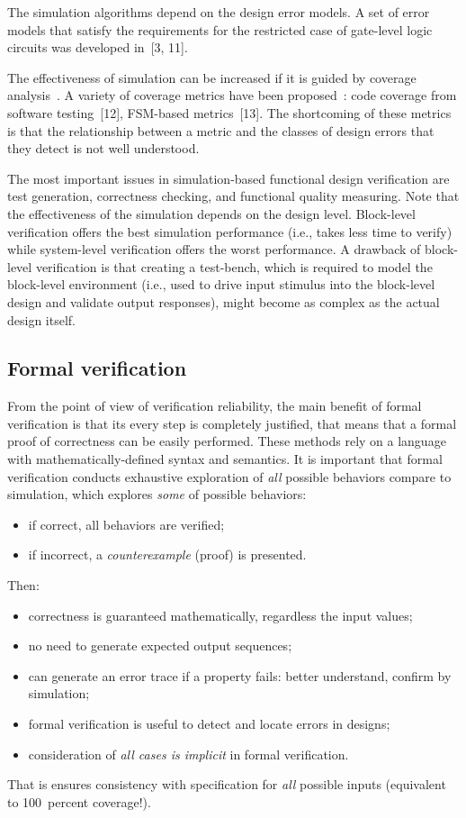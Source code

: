 \begin{multicols}{2}
   The simulation algorithms depend on the design error models. A set of error models that satisfy the
requirements for the restricted case of gate-level logic circuits was developed in~[3, 11].

   The effectiveness of simulation can be increased if it is guided by coverage analysis~\cite{3bar}. A variety
of coverage metrics have been proposed~\cite{6bar}: code coverage from software testing~[12],
FSM-based metrics~[13]. The shortcoming of these metrics is that the relationship between a
metric and the classes of design errors that they detect is not well understood.

   The most important issues in simulation-based function\-al design verification are test generation, correctness
checking, and functional quality measuring. Note that the effectiveness of the simulation depends on the design
level. Block-level verification offers the best simu\-lation performance (i.e., takes less time to verify) while
system-level verification offers the worst performance. A drawback of block-level verification is that creating a
test-bench, which is required to model the block-level environment (i.e., used to drive input stimulus into the
block-level design and validate output responses), might become as complex as the actual design itself.

\subsection{Formal verification} %

    \noindent
From the point of view of verification reliability, the main benefit of formal verification is that its every
step is completely justified, that means that a formal proof of correctness can be easily performed. These
methods rely on a language with mathematically-defined syntax and semantics. It is important
that formal
verification conducts exhaustive exploration of \textit{all} possible behaviors compare to simulation, which
explores \textit{some} of possible behaviors:
\begin{itemize}
\item  if correct, all behaviors are verified;
\item if incorrect, a \textit{counterexample} (proof) is presented.
\end{itemize}
   Then:
   \begin{itemize}
\item correctness is guaranteed mathematically, regardless the input values;
\item no need to generate expected output sequences;
\item can generate an error trace if a property fails: better understand, confirm by simulation;
\item formal verification is useful to detect and locate errors in designs;
\item consideration of \textit{all cases is implicit} in formal verification.
   \end{itemize}
   That is ensures consistency with specification for \textit{all}
possible inputs (equivalent to 100~percent coverage!).


\end{multicols}
